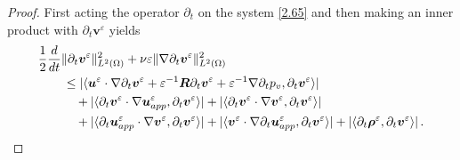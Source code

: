 \documentclass[10pt,a4paper]{amsart}
\begin{document}
\begin{proof}
	First acting the operator $\partial_t$ on the system \eqref{2.65} and then making an inner product with $\partial_t\boldsymbol{v}^\varepsilon$ yields
	\begin{align}
		\label{4.16.1}
		&\frac{1}{2}\frac{d}{dt}\lVert\partial_t\boldsymbol v^{\varepsilon}\rVert^2_{{L}^2(\Omega)}
		+\nu\varepsilon\lVert\nabla\partial_t\boldsymbol v^{\varepsilon}\rVert^2_{{L}^2(\Omega)}\notag\\
		&\qquad\leq
		|\langle{\boldsymbol u}^{\varepsilon} \cdot \nabla \partial_t{\boldsymbol v}^{\varepsilon}
		+	{\varepsilon}^{-1}\boldsymbol{R}
		\partial_t\boldsymbol v^{\varepsilon}
		+		{\varepsilon}^{-1}\nabla \partial_tp_v,\partial_t{\boldsymbol v}^{\varepsilon}\rangle|\notag\\
		&\qquad\quad+
		|\langle
		\partial_t{\boldsymbol v}^{\varepsilon}\cdot
		\nabla\boldsymbol{u}^{\varepsilon}_{app},
		\partial_t{\boldsymbol v}^{\varepsilon}
		\rangle|
		+
		|\langle
		\partial_t{\boldsymbol v}^{\varepsilon} \cdot \nabla\boldsymbol{v}^\varepsilon
		,\partial_t{\boldsymbol v}^{\varepsilon}\rangle|\notag\\
		&\qquad\quad+
		|\langle
		\partial_t{\boldsymbol u}_{app}^{\varepsilon} \cdot \nabla\boldsymbol{v}^\varepsilon
		,\partial_t{\boldsymbol v}^{\varepsilon}\rangle|
		+
		|\langle{\boldsymbol v}^{\varepsilon} \cdot \nabla\partial_t\boldsymbol{u}^\varepsilon_{app},
		\partial_t{\boldsymbol v}^{\varepsilon}\rangle|	
		+|\langle
		\partial_t\boldsymbol \rho^{\varepsilon}	,\partial_t{\boldsymbol v}^{\varepsilon}\rangle|
		\,.
	\end{align}
	

\end{proof}
\end{document}

